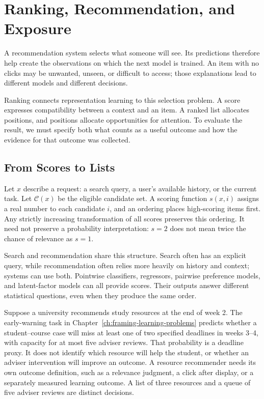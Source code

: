 \begingroup
\raggedbottom
{}
\chapter{Ranking, Recommendation, and Exposure}
\label{ch:ranking-recommendation}

A recommendation system selects what someone will see. Its predictions therefore help create the observations on which the next model is trained. An item with no clicks may be unwanted, unseen, or difficult to access; those explanations lead to different models and different decisions.

Ranking connects representation learning to this selection problem. A score expresses compatibility between a context and an item. A ranked list allocates positions, and positions allocate opportunities for attention. To evaluate the result, we must specify both what counts as a useful outcome and how the evidence for that outcome was collected.

\section{From Scores to Lists}

Let $x$ describe a request: a search query, a user's available history, or the current task. Let $\mathcal C(x)$ be the eligible candidate set. A scoring function $s(x,i)$ assigns a real number to each candidate $i$, and an ordering places high-scoring items first. Any strictly increasing transformation of all scores preserves this ordering. It need not preserve a probability interpretation: $s=2$ does not mean twice the chance of relevance as $s=1$.

Search and recommendation share this structure. Search often has an explicit query, while recommendation often relies more heavily on history and context; systems can use both. Pointwise classifiers, regressors, pairwise preference models, and latent-factor models can all provide scores. Their outputs answer different statistical questions, even when they produce the same order.

Suppose a university recommends study resources at the end of week 2. The early-warning task in Chapter~\ref{ch:framing-learning-problems} predicts whether a student--course case will miss at least one of two specified deadlines in weeks 3--4, with capacity for at most five adviser reviews. That probability is a deadline proxy. It does not identify which resource will help the student, or whether an adviser intervention will improve an outcome. A resource recommender needs its own outcome definition, such as a relevance judgment, a click after display, or a separately measured learning outcome. A list of three resources and a queue of five adviser reviews are distinct decisions.

